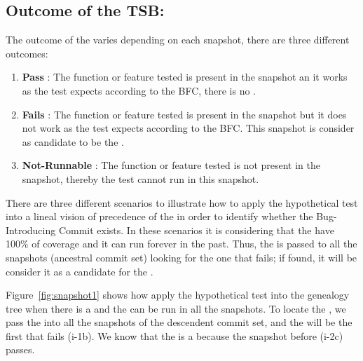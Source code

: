 \documentclass[a4paper, 12pt]{book}
\begin{document}

\subsection{Outcome of the TSB:}
The outcome of the \TSB varies depending on each snapshot, there are three different outcomes:
\begin{enumerate}
	\item {\textbf{Pass}} : The function or feature tested is present in the snapshot an it works as the test expects according to the BFC, there is no \BIC.
	\item {\textbf{Fails}} : The function or feature tested is present in the snapshot but it does not work as the test expects according to the BFC. This snapshot is consider as candidate to be the \BIC.
	\item {\textbf{Not-Runnable}} : The function or feature tested is not present in the snapshot, thereby the test cannot run in this snapshot. 
\end{enumerate}

There are three different scenarios to illustrate how to apply the hypothetical test into a lineal vision of precedence of the  in order to identify whether the Bug-Introducing Commit exists. In these scenarios it is considering that the \TSB have 100\% of coverage and it can run forever in the past. Thus, the \TSB is passed to all the snapshots (ancestral commit set) looking for the one that fails; if found, it will be consider it as a candidate for the \BIC. %

Figure~\ref{fig:snapshot1} shows how apply the hypothetical test into the genealogy tree when there is a \BIC and the \TSB can be run in all the snapshots. To locate the \BIC, we pass the \TSB into all the snapshots of the descendent commit set, and the \BIS will be the first that fails (i-1b). We know that the \BIS is a \BIC because the snapshot before (i-2c) passes. 
\end{document}
